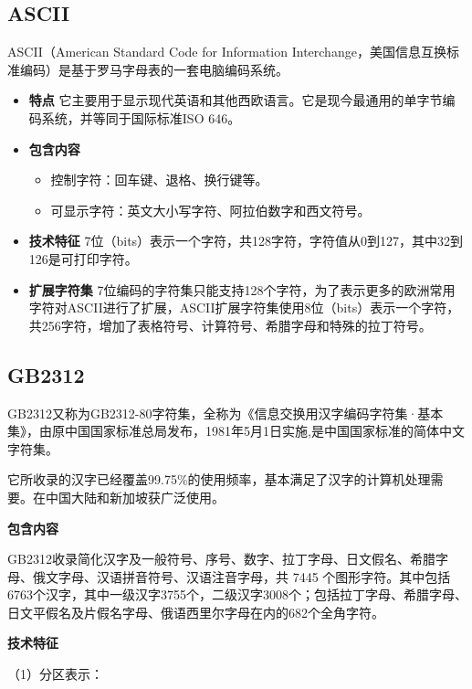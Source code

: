 \documentclass[doctor,openright,twoside]{sjtuthesis}
\providecommand{\tightlist}{%
    \setlength{\itemsep}{0pt}\setlength{\parskip}{0pt}}
\theoremstyle{plain}
\theoremstyle{definition}
\theoremstyle{remark}
\theoremstyle{ocrenumbox}
\theoremstyle{plain}
\begin{document}
\hypertarget{ascii}{%
\subsection{ASCII}\label{ascii}}

ASCII（American Standard Code for Information Interchange，美国信息互换标准编码）是基于罗马字母表的一套电脑编码系统。

\begin{itemize}
\tightlist
\item
  \textbf{特点} 它主要用于显示现代英语和其他西欧语言。它是现今最通用的单字节编码系统，并等同于国际标准ISO 646。
\item
  \textbf{包含内容}

  \begin{itemize}
  \tightlist
  \item
    控制字符：回车键、退格、换行键等。
  \item
    可显示字符：英文大小写字符、阿拉伯数字和西文符号。
  \end{itemize}
\item
  \textbf{技术特征} 7位（bits）表示一个字符，共128字符，字符值从0到127，其中32到126是可打印字符。
\item
  \textbf{扩展字符集} 7位编码的字符集只能支持128个字符，为了表示更多的欧洲常用字符对ASCII进行了扩展，ASCII扩展字符集使用8位（bits）表示一个字符，共256字符，增加了表格符号、计算符号、希腊字母和特殊的拉丁符号。
\end{itemize}

\hypertarget{gb2312}{%
\subsection{GB2312}\label{gb2312}}

GB2312又称为GB2312-80字符集，全称为《信息交换用汉字编码字符集·基本集》，由原中国国家标准总局发布，1981年5月1日实施,是中国国家标准的简体中文字符集。

它所收录的汉字已经覆盖99.75\%的使用频率，基本满足了汉字的计算机处理需要。在中国大陆和新加坡获广泛使用。

\textbf{包含内容}

GB2312收录简化汉字及一般符号、序号、数字、拉丁字母、日文假名、希腊字母、俄文字母、汉语拼音符号、汉语注音字母，共 7445 个图形字符。其中包括6763个汉字，其中一级汉字3755个，二级汉字3008个；包括拉丁字母、希腊字母、日文平假名及片假名字母、俄语西里尔字母在内的682个全角字符。

\textbf{技术特征}

（1）分区表示：
\end{document}
